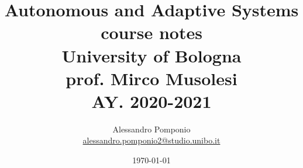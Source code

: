 \usepackage[utf8]{inputenc}
\usepackage{amsmath}
\usepackage{amssymb}
\usepackage{parskip}                    %
\usepackage{verbatim}
\usepackage{graphicx}
\usepackage{hyperref}                   %
\usepackage{wrapfig}                    %
\usepackage{afterpage}                  %
\usepackage{bbm}                        %
\usepackage{bm}                         %
\usepackage{caption}                    %
\usepackage{subfigure}                  %
\usepackage{tocbibind}                  %
\usepackage{colortbl}                   %
\usepackage[
    backend=biber,
    style=alphabetic,
    sorting=ynt
]{biblatex}

\usepackage[ruled,vlined,dotocloa]{algorithm2e}

\newcommand\addemptypage{       %
    \null
    \thispagestyle{empty}
    \addtocounter{page}{-1}
    \newpage
    }

\newcommand{\source}[1]{\vspace{-5pt} \caption*{ Source: {#1}} }

\DeclareMathOperator*{\argmax}{argmax}



\graphicspath{ {./Images/} }

\title{Autonomous and Adaptive Systems \\
        course notes\\
        University of Bologna \\
        \large	 prof. Mirco Musolesi \\
        AY. 2020-2021}
\author{Alessandro Pomponio \\ \href{mailto:alessandro.pomponio2@studio.unibo.it}{alessandro.pomponio2@studio.unibo.it}}
\date{\today}



\maketitle
\clearpage
\addemptypage

